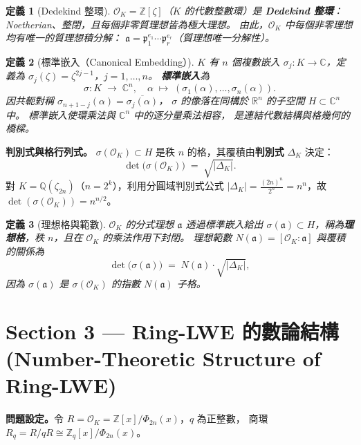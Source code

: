\documentclass[10.5pt, a4paper]{article}
\theoremstyle{cpt}
\newtheorem{definition}{定義}
\begin{document}
\begin{definition}[Dedekind 整環]
  $\mathcal{O}_K=\mathbb{Z}[\zeta]$（$K$ 的代數整數環）是 \textbf{Dedekind 整環}：
  Noetherian、整閉，且每個非零質理想皆為極大理想。
  由此，$\mathcal{O}_K$ 中每個非零理想均有唯一的質理想積分解：
  $\mathfrak{a}=\mathfrak{p}_1^{e_1}\cdots\mathfrak{p}_r^{e_r}$（質理想唯一分解性）。
\end{definition}

\begin{definition}[標準嵌入（Canonical Embedding）]
  $K$ 有 $n$ 個複數嵌入 $\sigma_j:K\to\mathbb{C}$，定義為 $\sigma_j(\zeta)=\zeta^{2j-1}$，$j=1,\ldots,n$。
  \textbf{標準嵌入}為
  \[
    \sigma\colon K\;\longrightarrow\;\mathbb{C}^n,\quad
    \alpha\;\longmapsto\;(\sigma_1(\alpha),\ldots,\sigma_n(\alpha)).
  \]
  因共軛對稱 $\sigma_{n+1-j}(\alpha)=\overline{\sigma_j(\alpha)}$，
  $\sigma$ 的像落在同構於 $\mathbb{R}^n$ 的子空間 $H\subset\mathbb{C}^n$ 中。
  標準嵌入使環乘法與 $\mathbb{C}^n$ 中的逐分量乘法相容，
  是連結代數結構與格幾何的橋樑。
\end{definition}

\textbf{判別式與格行列式。}
$\sigma(\mathcal{O}_K)\subset H$ 是秩 $n$ 的格，其覆積由\textbf{判別式} $\Delta_K$ 決定：
\[
  \det\bigl(\sigma(\mathcal{O}_K)\bigr)\;=\;\sqrt{|\Delta_K|}.
\]
對 $K=\mathbb{Q}(\zeta_{2n})$（$n=2^k$），利用分圓域判別式公式
$|\Delta_K|=\tfrac{(2n)^n}{2^n}=n^n$，故 $\det(\sigma(\mathcal{O}_K))=n^{n/2}$。

\begin{definition}[理想格與範數]
  $\mathcal{O}_K$ 的分式理想 $\mathfrak{a}$ 透過標準嵌入給出
  $\sigma(\mathfrak{a})\subset H$，稱為\textbf{理想格}，秩 $n$，且在 $\mathcal{O}_K$ 的乘法作用下封閉。
  理想範數 $N(\mathfrak{a})=[\mathcal{O}_K:\mathfrak{a}]$ 與覆積的關係為
  \[
    \det\bigl(\sigma(\mathfrak{a})\bigr)\;=\;N(\mathfrak{a})\cdot\sqrt{|\Delta_K|},
  \]
  因為 $\sigma(\mathfrak{a})$ 是 $\sigma(\mathcal{O}_K)$ 的指數 $N(\mathfrak{a})$ 子格。
\end{definition}

\section{Section 3 \;—\; Ring-LWE 的數論結構
  \textnormal{\small\color{gray}(Number-Theoretic Structure of Ring-LWE)}}

\textbf{問題設定。}令 $R=\mathcal{O}_K=\mathbb{Z}[x]/\Phi_{2n}(x)$，$q$ 為正整數，
商環 $R_q=R/qR\cong\mathbb{Z}_q[x]/\Phi_{2n}(x)$。
\end{document}
